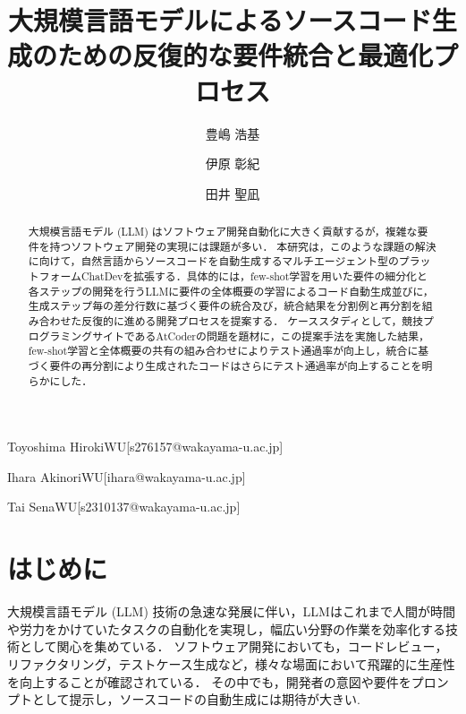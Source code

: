 \documentclass[submit,techrep,noauthor]{ipsj}
\begin{document}
\title{大規模言語モデルによるソースコード生成のための反復的な要件統合と最適化プロセス}



\author{豊嶋 浩基}{Toyoshima Hiroki}{WU}[s276157@wakayama-u.ac.jp]
\author{伊原 彰紀}{Ihara Akinori}{WU}[ihara@wakayama-u.ac.jp]
\author{田井 聖凪}{Tai Sena}{WU}[s2310137@wakayama-u.ac.jp]

\begin{abstract}
大規模言語モデル (LLM) はソフトウェア開発自動化に大きく貢献するが，複雑な要件を持つソフトウェア開発の実現には課題が多い．
本研究は，このような課題の解決に向けて，自然言語からソースコードを自動生成するマルチエージェント型のプラットフォームChatDevを拡張する．具体的には，few-shot学習を用いた要件の細分化と各ステップの開発を行うLLMに要件の全体概要の学習によるコード自動生成並びに，生成ステップ毎の差分行数に基づく要件の統合及び，統合結果を分割例と再分割を組み合わせた反復的に進める開発プロセスを提案する．
ケーススタディとして，競技プログラミングサイトであるAtCoderの問題を題材に，この提案手法を実施した結果，few-shot学習と全体概要の共有の組み合わせによりテスト通過率が向上し，統合に基づく要件の再分割により生成されたコードはさらにテスト通過率が向上することを明らかにした．

\end{abstract}

\maketitle

\section{はじめに}

大規模言語モデル (LLM) 技術の急速な発展に伴い\cite{Growing_LLM}，LLMはこれまで人間が時間や労力をかけていたタスクの自動化を実現し，幅広い分野の作業を効率化する技術として関心を集めている．
ソフトウェア開発においても，コードレビュー，リファクタリング，テストケース生成など，様々な場面において飛躍的に生産性を向上することが確認されている\cite{LLM_CodeReview}\cite{LLM_Refactoring}\cite{LLM_Gene_Test}．
その中でも，開発者の意図や要件をプロンプトとして提示し，ソースコードの自動生成には期待が大きい\cite{LLM_CodeGeneration}.
\end{document}
